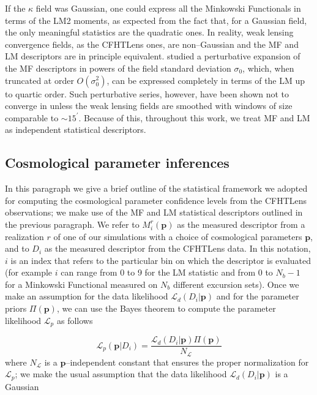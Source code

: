 \documentclass[reprint,aps,prd,superscriptaddress,showkeys]{revtex4-1}
\begin{document}
%
If the $\kappa$ field was Gaussian, one could express all the Minkowski Functionals in terms of the LM2 moments, as expected from the fact that, for a Gaussian field, the only meaningful statistics are the quadratic ones. In reality, weak lensing convergence fields, as the CFHTLens ones, are non--Gaussian and the MF and LM descriptors are in principle equivalent. \citep{Munshi12,Matsubara10} studied a perturbative expansion of the MF descriptors in powers of the field standard deviation $\sigma_0$, which, when truncated at order $O(\sigma_0^2)$, can be expressed completely in terms of the LM up to quartic order. Such perturbative series, however, have been shown not to converge in \citep{Petri2013} unless the weak lensing fields are smoothed with windows of size comparable to $\sim 15^\prime$. Because of this, throughout this work, we treat MF and LM as independent statistical descriptors. 

\subsection{Cosmological parameter inferences}
\label{cosmostats}
In this paragraph we give a brief outline of the statistical framework we adopted for computing the cosmological parameter confidence levels from the CFHTLens observations; we make use of the MF and LM statistical descriptors outlined in the previous paragraph. We refer to $M_i^r(\mathbf{p})$ as the measured descriptor from a realization $r$ of one of our simulations with a choice of cosmological parameters $\mathbf{p}$, and to $D_i$ as the measured descriptor from the CFHTLens data. In this notation, $i$ is an index that refers to the particular bin on which the descriptor is evaluated (for example $i$ can range from 0 to 9 for the LM statistic and from 0 to $N_b-1$ for a Minkowski Functional measured on $N_b$ different excursion sets). Once we make an assumption for the data likelihood $\mathcal{L}_d(D_i\vert \mathbf{p})$ and for the parameter priors $\Pi(\mathbf{p})$, we can use the Bayes theorem to compute the parameter likelihood $\mathcal{L}_p$ as follows

\begin{equation}
\label{parameterlikelihood}
\mathcal{L}_p(\mathbf{p}\vert D_i) = \frac{\mathcal{L}_d(D_i\vert \mathbf{p})\Pi(\mathbf{p})}{N_{\mathcal{L}}}
\end{equation}
%
where $N_{\mathcal{L}}$ is a $\mathbf{p}$--independent constant that ensures the proper normalization for $\mathcal{L}_p$; we make the usual assumption that the data likelihood $\mathcal{L}_d(D_i\vert \mathbf{p})$ is a Gaussian
\end{document}
